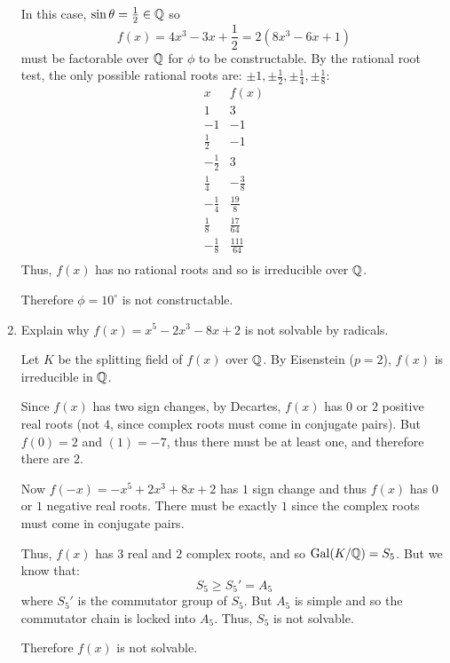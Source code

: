 \documentclass[letterpaper,12pt,fleqn]{article}
\renewcommand{\o}{\theta}
\newcommand{\p}{\phi}
\DeclareMathOperator{\Gal}{Gal}
\begin{document}
\begin{enumerate}
  In this case, $\sin\o=\frac{1}{2}\in\Q$ so
  \[f(x)=4x^3-3x+\frac{1}{2}=2(8x^3-6x+1)\]
  must be factorable over $\mathbb{Q}$ for $\p$ to be constructable. By the rational
  root test, the only possible rational roots are:
  $\pm1,\pm\frac{1}{2},\pm\frac{1}{4},\pm\frac{1}{8}$:
  \[\begin{array}{c|c}
  x & f(x) \\
  \hline
  1 & 3 \\
  -1 & -1 \\
  \frac{1}{2} & -1 \\
  -\frac{1}{2} & 3 \\
  \frac{1}{4} & -\frac{3}{8}\\
  -\frac{1}{4} & \frac{19}{8} \\
  \frac{1}{8} & \frac{17}{64} \\
  -\frac{1}{8} & \frac{111}{64} \\
  \end{array}\]
  Thus, $f(x)$ has no rational roots and so is irreducible over $\mathbb{Q}$.

  Therefore $\p=10^{\circ}$ is not constructable.

  \bigskip

\item Explain why $f(x)=x^5-2x^3-8x+2$ is not solvable by radicals.

  Let $K$ be the splitting field of $f(x)$ over $\mathbb{Q}$. By Eisenstein ($p=2$),
  $f(x)$ is irreducible in $\mathbb{Q}$.

  Since $f(x)$ has two sign changes, by Decartes, $f(x)$ has $0$ or $2$
  positive real roots (not $4$, since complex roots must come in conjugate
  pairs). But $f(0)=2$ and $(1)=-7$, thus there must be at least one, and
  therefore there are $2$.

  Now $f(-x)=-x^5+2x^3+8x+2$ has $1$ sign change and thus $f(x)$ has $0$ or
  $1$ negative real roots. There must be exactly $1$ since the complex roots
  must come in conjugate pairs.

  Thus, $f(x)$ has $3$ real and $2$ complex roots, and so $\Gal(K/\Q)=S_5$.
  But we know that:
  \[S_5\ge S_5'=A_5\]
  where $S_5'$ is the commutator group of $S_5$. But $A_5$ is simple and so
  the commutator chain is locked into $A_5$. Thus, $S_5$ is not solvable.

  Therefore $f(x)$ is not solvable.
\end{enumerate}
\end{document}
